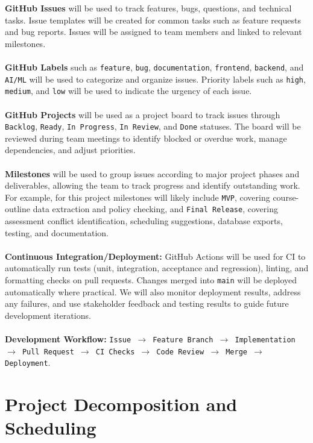 \documentclass{article}
\begin{document}
\noindent \textbf{GitHub Issues} will be used to track features, bugs, questions, and technical tasks. Issue templates will be created for common tasks such as feature requests and bug reports. Issues will be assigned to team members and linked to relevant milestones.
\\\\
\noindent \textbf{GitHub Labels} such as \texttt{feature}, \texttt{bug}, \texttt{documentation}, \texttt{frontend}, \texttt{backend}, and \texttt{AI/ML} will be used to categorize and organize issues. Priority labels such as \texttt{high}, \texttt{medium}, and \texttt{low} will be used to indicate the urgency of each issue.
\\\\
\noindent\textbf{GitHub Projects} will be used as a project board to track issues through \texttt{Backlog}, \texttt{Ready}, \texttt{In Progress}, \texttt{In Review}, and \texttt{Done} statuses. The board will be reviewed during team meetings to identify blocked or overdue work, manage dependencies, and adjust priorities.
\\\\
\noindent\textbf{Milestones} will be used to group issues according to major project phases 
and deliverables, allowing the team to track progress and identify outstanding work. 
For example, for this project milestones will likely include \texttt{MVP}, 
covering course-outline data extraction and policy checking, and \texttt{Final Release}, covering assessment conflict identification, scheduling suggestions, database exports, testing, and documentation.
\\\\
\noindent\textbf{Continuous Integration/Deployment:} GitHub Actions will be used for CI to automatically run tests (unit, integration, acceptance and regression), linting, and formatting checks on pull requests. Changes merged into \texttt{main} will be deployed automatically where practical. We will also monitor deployment results, address any failures, and use stakeholder feedback and testing results to guide future development iterations.
\\ \\
\noindent\textbf{Development Workflow:}
\texttt{Issue $\rightarrow$ Feature Branch $\rightarrow$ Implementation $\rightarrow$ Pull Request $\rightarrow$ CI Checks $\rightarrow$ Code Review $\rightarrow$ Merge $\rightarrow$ Deployment}.

\section{Project Decomposition and Scheduling}
\end{document}
